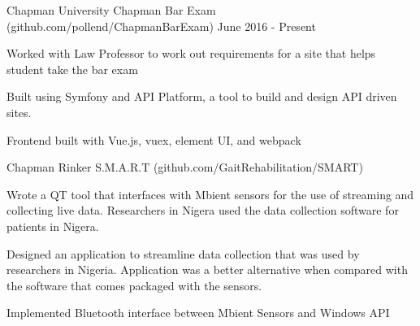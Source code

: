 \begin{cventries}
   
    \cventry
    {Chapman University} %
    {Chapman Bar Exam ({\tiny github.com/pollend/ChapmanBarExam})} %
    {} %
    { June 2016 - Present} %
    {
      \begin{cvitems} %
        \item{Worked with Law Professor to work out requirements for a site that helps student take the bar exam}
        \item{Built using Symfony and API Platform, a tool to build and design API driven sites.}
        \item{Frontend built with Vue.js, vuex, element UI, and webpack}
      \end{cvitems}
    }
  
  \cventry
    {Chapman Rinker} %
    {S.M.A.R.T ({\tiny github.com/GaitRehabilitation/SMART})} %
    {} %
    {} %
    {
      \begin{cvitems} %
        \item {Wrote a QT tool that interfaces with Mbient sensors for the use of streaming and collecting live data. Researchers in Nigera used the data collection software for patients in Nigera.}
        \item{Designed an application to streamline data collection that was used by researchers in Nigeria.  Application was a better alternative when compared with the software that comes packaged with the sensors.}
        \item{Implemented Bluetooth interface between Mbient Sensors and Windows API}
      \end{cvitems}
    }


    

\end{cventries}
